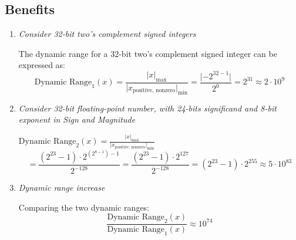 \documentclass[12pt,openany]{book}
\begin{document}
			      	\subsection{Benefits }
			      	\begin{enumerate}
			      		\item \textit{Consider 32-bit two's complement signed integers}
			      		          
			      		      The dynamic range for a 32-bit two's complement signed integer can be expressed as:
			      		      \begin{equation*}
			      		      	\text{Dynamic Range}_1 (x) = \frac{\lvert x \rvert_{\text{max}}}{\lvert x_{\text{positive, nonzero}} \rvert_{\text{min}}} = \frac{\lvert -2^{32-1} \rvert}{2^0} = 2^{31} \approx 2 \cdot 10^9
			      		      \end{equation*}
			      		          
			      		\item \textit{Consider 32-bit floating-point number, with 24-bits significand and 8-bit exponent in Sign and Magnitude}
			      		             
			      		      {$\text{Dynamic Range}_2 (x) = \frac{\lvert x \rvert_{\text{max}}}{\lvert x_{\text{positive, nonzero}} \rvert_{\text{min}}}$ $$= \frac{(2^{23} - 1) \cdot 2^{(2^{8-1}) - 1}}{2^{-128}} = \frac{(2^{23} - 1) \cdot 2^{127}}{2^{-128}} = (2^{23} - 1) \cdot 2^{255} \approx 5 \cdot 10^{83}$$}
			      		      
			      		          
			      		\item \textit{Dynamic range increase}
			      		          
			      		      Comparing the two dynamic ranges:
			      		      \begin{equation*}
			      		      	\frac{\text{Dynamic Range}_2 (x)}{\text{Dynamic Range}_1 (x)} \approx 10^{74}
			      		      \end{equation*}
			      	\end{enumerate}
			      	\newpage
			      	
\end{document}
